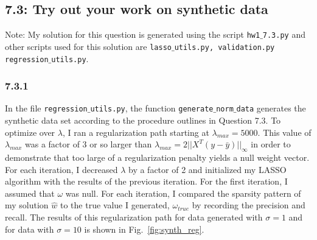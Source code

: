 \documentclass[12pt]{amsart}
\begin{document}
\subsection*{7.3: Try out your work on synthetic data}

Note: My solution for this question is generated using the script {\tt hw1$\_$7.3.py} and other scripts used for this solution are {\tt lasso$\_$utils.py, validation.py  regression$\_$utils.py}.

\subsubsection*{7.3.1}

In the file {\tt regression$\_$utils.py}, the function {\tt generate$\_$norm$\_$data} generates the synthetic data set according to the procedure outlines in Question 7.3.  To optimize over $\lambda$, I ran a regularization path starting at $\lambda_{max} = 5000$.  This value of  $\lambda_{max}$ was a factor of 3 or so larger than $\lambda_{max} = 2 ||X^{T}(y - \bar{y}) ||_{\infty}$ in order to demonstrate that too large of a regularization penalty yields a null weight vector.  For each iteration, I decreased $\lambda$ by a factor of 2 and initialized my LASSO algorithm with the results of the previous iteration.  For the first iteration, I assumed that $\omega$ was null.  For each iteration, I compared the sparsity pattern of my solution $\hat{w}$ to the true value I generated, $\omega_{true}$ by recording the precision and recall. The results of this regularization path for data generated with $\sigma = 1$ and for data with $\sigma = 10$ is shown in Fig.~\ref{fig:synth_reg}.
\end{document}

